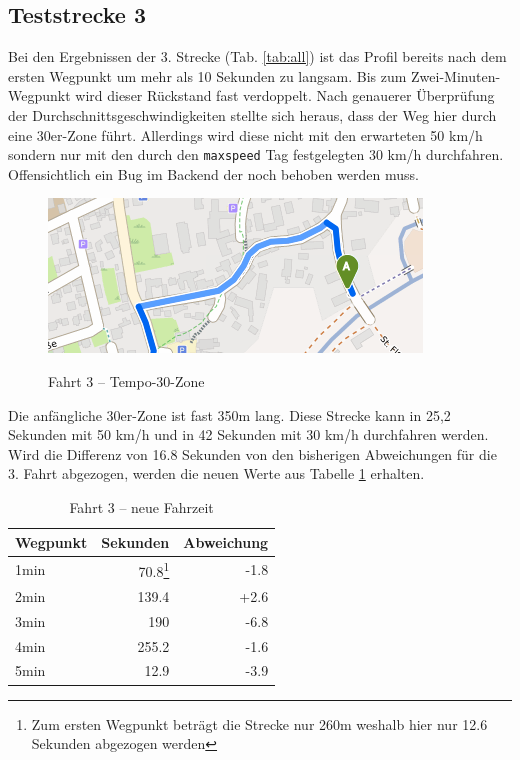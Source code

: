 \subsection{Teststrecke 3}

Bei den Ergebnissen der 3. Strecke (Tab. \ref{tab:all}) ist das Profil bereits nach dem ersten Wegpunkt um mehr als 10 Sekunden zu langsam. Bis zum Zwei-Minuten-Wegpunkt wird dieser Rückstand fast verdoppelt. Nach genauerer Überprüfung der Durchschnittsgeschwindigkeiten stellte sich heraus, dass der Weg hier durch eine 30er-Zone führt. Allerdings wird diese nicht mit den erwarteten 50 km/h sondern nur mit den durch den \texttt{maxspeed} Tag festgelegten 30 km/h durchfahren. Offensichtlich ein Bug im Backend der noch behoben werden muss.

\begin{figure}[h]
\centering
\caption{Fahrt 3 -- Tempo-30-Zone}
\label{fig:temp30}
\includegraphics[width = 0.60 \textwidth]{../media/Fahrt3_temp30.png} \\
\end{figure}

Die anfängliche 30er-Zone ist fast 350m lang. Diese Strecke kann in 25,2 Sekunden mit 50 km/h und in 42 Sekunden mit 30 km/h durchfahren werden. Wird die Differenz von 16.8 Sekunden von den bisherigen Abweichungen für die 3. Fahrt abgezogen, werden die neuen Werte aus Tabelle \ref{tab:new3} erhalten.

\begin{table}[h]
\centering
\caption{Fahrt 3 -- neue Fahrzeit}
\label{tab:new3}
\begin{tabular}{|l|r|r|}
\hline
Wegpunkt & Sekunden & Abweichung \\ \hline 
1min & 70.8\footnote{Zum ersten Wegpunkt beträgt die Strecke nur 260m weshalb hier nur 12.6 Sekunden abgezogen werden} & -1.8  \\
2min & 139.4 & +2.6  \\
3min & 190 & -6.8  \\
4min & 255.2 & -1.6  \\
5min & 12.9 & -3.9  \\
\hline
\end{tabular}
\end{table}

